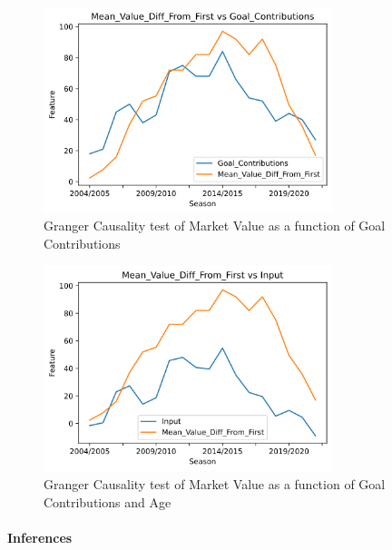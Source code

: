 \documentclass[
  english,
  doc,floatsintext]{apa6}
\let\oldparagraph\paragraph
\renewcommand{\paragraph}[1]{\oldparagraph{#1}\mbox{}}
\begin{document}
\begin{figure}[H]
  \begin{center}
  \includegraphics[width=0.9\linewidth, height=6cm]{assets/Mean_Value_Diff_From_First vs Goal_Contributions.png}
  \end{center}
  
  \captionsetup{justification=centering}
  \caption{Granger Causality test of Market Value as a function of Goal Contributions}
\end{figure}

\begin{figure}[H]
  \begin{center}
  \includegraphics[width=0.9\linewidth, height=6cm]{assets/Mean_Value_Diff_From_First vs Input.png}
  \end{center}
  
  \captionsetup{justification=centering}
  \caption{Granger Causality test of Market Value as a function of Goal Contributions and Age}
\end{figure}

\hypertarget{inferences-1}{%
\paragraph{Inferences}\label{inferences-1}}
\end{document}
